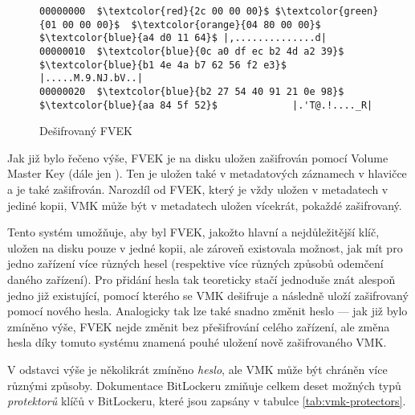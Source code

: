 \begin{figure}[h]
		\centering
		\captionsetup{width=0.65\linewidth}
		\caption{Dešifrovaný FVEK}
		\label{fig:fvek-decrypted}

\begin{lstlisting}[frame=none, escapechar=$, basicstyle=\ttfamily\small, columns=fullflexible, keepspaces=true]
00000000  $\textcolor{red}{2c 00 00 00}$ $\textcolor{green}{01 00 00 00}$  $\textcolor{orange}{04 80 00 00}$ $\textcolor{blue}{a4 d0 11 64}$ |,..............d|
00000010  $\textcolor{blue}{0c a0 df ec b2 4d a2 39}$  $\textcolor{blue}{b1 4e 4a b7 62 56 f2 e3}$ |.....M.9.NJ.bV..|
00000020  $\textcolor{blue}{b2 27 54 40 91 21 0e 98}$  $\textcolor{blue}{aa 84 5f 52}$             |.'T@.!...._R|
\end{lstlisting}

\end{figure}



Jak již bylo řečeno výše, FVEK je na disku uložen zašifrován pomocí Volume Master Key (dále jen ). Ten je uložen také v metadatových záznamech v hlavičce a je také zašifrován. Narozdíl od FVEK, který je vždy uložen v metadatech v jediné kopii, VMK může být v metadatech uložen vícekrát, pokaždé  zašifrovaný.

Tento systém umožňuje, aby byl FVEK, jakožto hlavní a nejdůležitější klíč, uložen na disku pouze v jedné kopii, ale zároveň existovala možnost, jak mít pro jedno zařízení více různých hesel (respektive více různých způsobů odemčení daného zařízení). Pro přidání  hesla tak teoreticky stačí jednoduše znát alespoň jedno již existující, pomocí kterého se VMK dešifruje a následně uloží zašifrovaný pomocí nového hesla. Analogicky tak lze také snadno změnit heslo --- jak již bylo zmíněno výše, FVEK nejde změnit bez přešifrování celého zařízení, ale změna hesla díky tomuto systému znamená pouhé uložení nově zašifrovaného VMK.

V odstavci výše je několikrát zmíněno \emph{heslo}, ale VMK může být chráněn více různými způsoby. Dokumentace BitLockeru \cite{Zxwr6wjYZUQ6z8Yo} zmiňuje celkem deset možných typů \emph{protektorů} klíčů v BitLockeru, které jsou zapsány v tabulce \ref{tab:vmk-protectors}.

